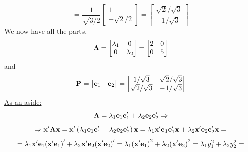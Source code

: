 \begin{enumerate}[font=\bfseries]
\[            =
            \frac{1}{\sqrt{3/2}}
            \begin{bmatrix}
                1 \\
                -\sqrt{2}/2
            \end{bmatrix}
            =
            \begin{bmatrix}
                \sqrt{2}/\sqrt{3} \\
                -1/\sqrt{3}
            \end{bmatrix}
        \]
        We now have all the parts,
        \[
            \bold{\Lambda}
            =
            \begin{bmatrix}
                \lambda_1 & 0 \\
                0 & \lambda_2
            \end{bmatrix}
            =
            \begin{bmatrix}
                2 & 0 \\
                0 & 5
            \end{bmatrix}
        \]
        and
        \[
            \bold{P}
            =
            \begin{bmatrix}
                \bold{e}_1 & \bold{e}_2
            \end{bmatrix}
            =
            \begin{bmatrix}
                1/\sqrt{3} & \sqrt{2}/\sqrt{3} \\
                \sqrt{2}/\sqrt{3} & -1/\sqrt{3}
            \end{bmatrix}
        \]
        \underline{As an aside:}
        \[
            \bold{A} = \lambda_1\bold{e}_1\bold{e}_1^\prime + \lambda_2\bold{e}_2\bold{e}_2^\prime
            \Rightarrow
        \]
        \[
            \Rightarrow
            \bold{x}^\prime\bold{A}\bold{x}
            =
            \bold{x}^\prime\left(\lambda_1\bold{e}_1\bold{e}_1^\prime + \lambda_2\bold{e}_2\bold{e}_2^\prime\right)\bold{x}
            =
            \lambda_1\bold{x}^\prime\bold{e}_1\bold{e}_1^\prime\bold{x} + \lambda_2\bold{x}^\prime\bold{e}_2\bold{e}_2^\prime\bold{x}
            =
        \]
        \[
            =
            \lambda_1\bold{x}^\prime\bold{e}_1{\left(\bold{x}^\prime\bold{e}_1\right)}^\prime + \lambda_2\bold{x}^\prime\bold{e}_2{\left(\bold{x}^\prime\bold{e}_2\right)}^\prime
            =
            \lambda_1{\left(\bold{x}^\prime\bold{e}_1\right)}^2 + \lambda_2{\left(\bold{x}^\prime\bold{e}_2\right)}^2
            =
            \lambda_1y_1^2 + \lambda_2y_2^2
            =
\]
\end{enumerate}
